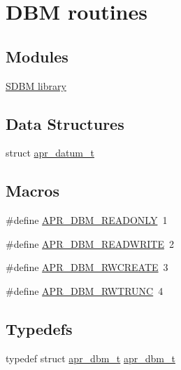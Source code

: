 \hypertarget{group___a_p_r___util___d_b_m}{\section{D\-B\-M routines}
\label{group___a_p_r___util___d_b_m}
}
\subsection*{Modules}
\begin{DoxyCompactItemize}
\item 
\hyperlink{group___a_p_r___util___d_b_m___s_d_b_m}{S\-D\-B\-M library}
\end{DoxyCompactItemize}
\subsection*{Data Structures}
\begin{DoxyCompactItemize}
\item 
struct \hyperlink{structapr__datum__t}{apr\-\_\-datum\-\_\-t}
\end{DoxyCompactItemize}
\subsection*{Macros}
\begin{DoxyCompactItemize}
\item 
\#define \hyperlink{group___a_p_r___util___d_b_m_gacd6e9c0783bd0c232bdd02b14655b6b1}{A\-P\-R\-\_\-\-D\-B\-M\-\_\-\-R\-E\-A\-D\-O\-N\-L\-Y}~1
\item 
\#define \hyperlink{group___a_p_r___util___d_b_m_gaf693166e76d6f84b12a0d75307687053}{A\-P\-R\-\_\-\-D\-B\-M\-\_\-\-R\-E\-A\-D\-W\-R\-I\-T\-E}~2
\item 
\#define \hyperlink{group___a_p_r___util___d_b_m_gabf461a27dab1f4cc7405e891d2ad6522}{A\-P\-R\-\_\-\-D\-B\-M\-\_\-\-R\-W\-C\-R\-E\-A\-T\-E}~3
\item 
\#define \hyperlink{group___a_p_r___util___d_b_m_ga8bffe207158704162c24fa74dc1b9264}{A\-P\-R\-\_\-\-D\-B\-M\-\_\-\-R\-W\-T\-R\-U\-N\-C}~4
\end{DoxyCompactItemize}
\subsection*{Typedefs}
\begin{DoxyCompactItemize}
\item 
typedef struct \hyperlink{structapr__dbm__t}{apr\-\_\-dbm\-\_\-t} \hyperlink{group___a_p_r___util___d_b_m_ga47f6ff771143ed7b7987c686c20c8536}{apr\-\_\-dbm\-\_\-t}
\end{DoxyCompactItemize}
